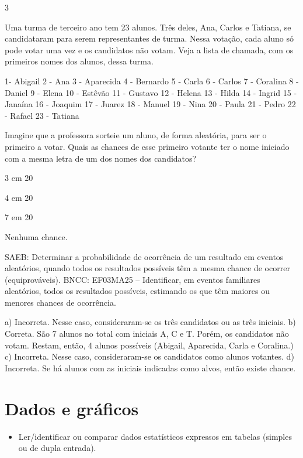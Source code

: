 {\begin{escolha}
\num{3}

Uma turma de terceiro ano tem 23 alunos. Três deles, Ana, Carlos e Tatiana, se candidataram para serem representantes de turma. Nessa votação, cada aluno só pode votar uma vez e os candidatos não votam. Veja a lista de chamada, com os primeiros nomes dos alunos, dessa turma.

1- Abigail
2 - Ana
3 - Aparecida
4 - Bernardo
5 - Carla
6 - Carlos
7 - Coralina
8 - Daniel 
9 - Elena
10 - Estêvão
11 - Gustavo
12 - Helena
13 - Hilda
14 - Ingrid
15 - Janaína
16 - Joaquim
17 - Juarez
18 - Manuel
19 - Nina
20 - Paula
21 - Pedro
22 - Rafael
23 - Tatiana

Imagine que a professora sorteie um aluno, de forma aleatória, para ser o primeiro a votar. Quais as chances de esse primeiro votante ter o nome iniciado com a mesma letra de um dos nomes dos candidatos?


\begin{escolha}
\item
3 em 20
\item
4 em 20
\item
7 em 20
\item
Nenhuma chance.
\end{escolha}

SAEB: Determinar a probabilidade de ocorrência de um resultado em eventos aleatórios, quando todos os resultados possíveis têm a mesma chance de ocorrer (equiprováveis). 
BNCC: EF03MA25 -- Identificar, em eventos familiares aleatórios, todos os resultados possíveis,
estimando os que têm maiores ou menores chances de ocorrência.

a) Incorreta. Nesse caso, consideraram-se os três candidatos ou as três iniciais.
b) Correta. São 7 alunos no total com iniciais A, C e T. Porém, os candidatos não votam. Restam, então, 4 alunos possíveis (Abigail, Aparecida, Carla e Coralina.)
c) Incorreta. Nesse caso, consideraram-se os candidatos como alunos votantes.
d) Incorreta. Se há alunos com as iniciais indicadas como alvos, então existe chance.

\chapter{Dados e gráficos}


\begin{itemize}
    \item Ler/identificar ou comparar dados estatísticos expressos em tabelas
(simples ou de dupla entrada).


\end{itemize}
\end{escolha}}
